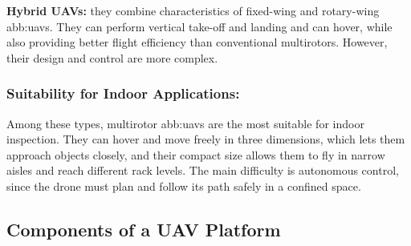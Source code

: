\textbf{Hybrid UAVs:} they combine characteristics of fixed-wing and rotary-wing
\glspl{abb:uav}. They can perform vertical take-off and landing and can hover,
while also providing better flight efficiency than conventional
multirotors. However, their design and control are more
complex.

\subsubsection*{Suitability for Indoor Applications:}

Among these types, multirotor \glspl{abb:uav} are the most suitable for indoor
inspection. They can hover and move freely in three dimensions, which lets them
approach objects closely, and their compact size
allows them to fly in narrow aisles and reach different rack levels. The main difficulty is autonomous control, since the drone must plan and follow its path safely in a confined space.

\subsection{Components of a UAV Platform}%
\label{subsec:bg:uav-components}

